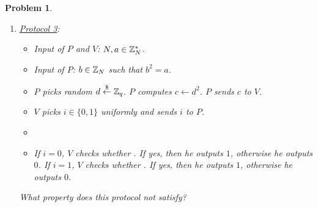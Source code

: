 \documentclass{../homework}
\newtheorem{problem}{Problem}
\newcommand{\rgets}{\stackrel{\mathdollar}\leftarrow}
\newcommand{\iseq}{\stackrel{?}=}
\begin{document}
\begin{problem}
\begin{enumerate}
        What property does this protocol not satisfy?
        
        \item \underline{Protocol 3}:
        \begin{itemize}
            \item Input of $P$ and $V$: $N,a\in \mathbb Z_N^{*}$.
            \item Input of $P$: $b\in \mathbb Z_N$ such that $b^2=a$.
            \item $P$ picks random $d\rgets \Z_q$. $P$ computes $c\gets d^2$.
            $P$ sends $c$ to $V$.
            \item $V$ picks $i\in\{0,1\}$ uniformly and sends $i$ to $P$.
            \item {}
            \item If $i=0$, $V$ checks whether \pmb{$z_1^2\iseq c$}. If yes,
            then he outputs $1$, otherwise he outputs $0$. If $i=1$, $V$ checks
            whether \pmb{$z_2^2\iseq a\cdot c$}. If yes, then he outputs $1$,
            otherwise he outputs $0$.
        \end{itemize}
        
        What property does this protocol not satisfy?
    \end{enumerate}
\end{problem}
\end{document}
